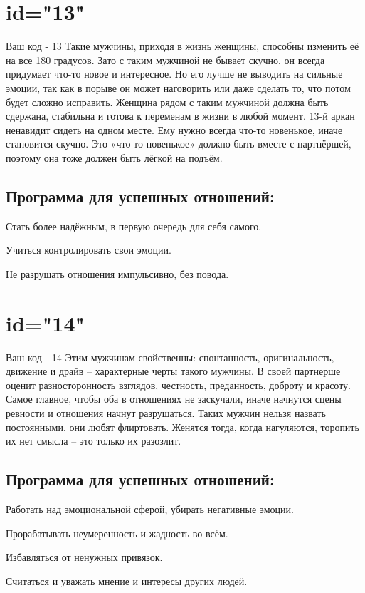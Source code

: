 \section{id="13"}{Ваш код - 13}
Такие мужчины, приходя в жизнь женщины, способны изменить её на все 
180 градусов. Зато с таким мужчиной не бывает скучно, он всегда 
придумает что-то новое и интересное. Но его лучше не выводить на 
сильные эмоции, так как в порыве он может наговорить или даже 
сделать то, что потом будет сложно исправить. Женщина рядом с таким 
мужчиной должна быть сдержана, стабильна и готова к переменам в 
жизни в любой момент. 13-й аркан ненавидит сидеть на одном месте. 
Ему нужно всегда что-то новенькое, иначе становится скучно. Это 
«что-то новенькое» должно быть вместе с партнёршей, поэтому она 
тоже должен быть лёгкой на подъём.
\subsection{Программа для успешных отношений:}
\item Стать более надёжным, в первую очередь для себя самого.
\item Учиться контролировать свои эмоции.
\item Не разрушать отношения импульсивно, без повода.
\endsubsection
\endsection

\section{id="14"}{Ваш код - 14}
Этим мужчинам свойственны: спонтанность, оригинальность, движение 
и драйв – характерные черты такого мужчины. В своей партнерше 
оценит разносторонность взглядов, честность, преданность, доброту 
и красоту. Самое главное, чтобы оба в отношениях не заскучали, 
иначе начнутся сцены ревности и отношения начнут разрушаться. 
Таких мужчин нельзя назвать постоянными, они любят флиртовать. 
Женятся тогда, когда нагуляются, торопить их нет смысла – это 
только их разозлит.
\subsection{Программа для успешных отношений:}
\item Работать над эмоциональной сферой, убирать негативные эмоции.
\item Прорабатывать неумеренность и жадность во всём.
\item Избавляться от ненужных привязок.
\item Считаться и уважать мнение и интересы других людей.
\endsubsection
\endsection

